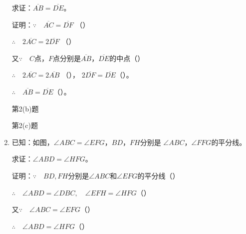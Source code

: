\begin{Exercise}
\begin{question}
\begin{enumerate}
求证：$\overline{AB}=\overline{DE}$。

证明：$\because\quad \overline{AC}=\overline{DF}$ （\qquad）

$\therefore\quad 2\overline{AC}=2\overline{DF}$ （\qquad）

又$\because\quad C$点，$F$点分别是$\overline{AB}$，$\overline{DE}$的中点（\qquad）

$\therefore\quad 2\overline{AC}=2\overline{AB}$ （\qquad），
$2\overline{DF}=\overline{DE}$（\qquad）。

$\therefore\quad \overline{AB}=\overline{DE}$（\qquad）。

\begin{figurehere}
    \begin{minipage}[b]{0.48\linewidth}
    \centering
{}
    \caption*{第2(b)题}
    \end{minipage}
    \begin{minipage}[b]{0.48\linewidth}
    \centering
    \caption*{第2(c)题}
    \end{minipage}
    \end{figurehere}


\item 已知：如图，$\angle ABC=\angle EFG$，$BD$，$FH$分别是
$\angle ABC$，$\angle FFG$的平分线。

求证：$\angle ABD=\angle HFG$。

证明：$\because\quad BD, FH$分别是$\angle ABC$和$\angle EFG$的平分线（\qquad ）

$\therefore\quad \angle ABD=\angle DBC,\quad \angle EFH=\angle HFG$（\qquad）

又$\because\quad \angle ABC=\angle EFG$（\qquad）

$\therefore\quad \angle ABD=\angle HFG$（\qquad）

\begin{figurehere}
    \begin{minipage}[b]{0.48\linewidth}
    \centering
{}
\end{minipage}
\end{figurehere}
\end{enumerate}
\end{question}
\end{Exercise}
